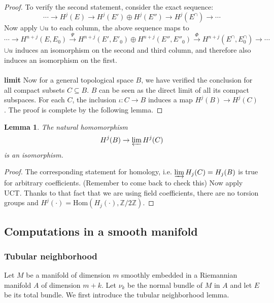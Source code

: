 \documentclass[12pt]{article}
\theoremstyle{plain}
\newtheorem{lemma}[equation]{Lemma}
\theoremstyle{definition}
\newcommand{\IZ}{\mathbb{Z}}
\newcommand{\Hom}{\mathrm{Hom}}
\newcommand{\<}{\langle}
\renewcommand{\>}{\rangle}
\newcommand{\invlim}{\varprojlim}
\begin{document}
\begin{proof}
To verify the second statement, consider the exact sequence: 
$$ \cdots \to H^j(E) \to H^j(E') \oplus H^j(E'') \to H^j(E^\cap) \to \cdots $$
Now apply $\cup u $ to each column, the above sequence maps to 
$$ \cdots \to H^{n + j}(E, E_0) \stackrel{\Psi}{\to} H^{n + j}(E', E'_0) \oplus H^{n + j}(E'', E''_0) \stackrel{\Phi}{\to} H^{n + j}(E^\cap, E^\cap_0) \to \cdots $$ 
$\cup u$ induces an isomorphism on the second and third column, and therefore also induces an isomorphism on the first. \\\\
\textbf{limit}
Now for a general topological space $B$, we have verified the conclusion for all compact subsets $C \subseteq B$. $B$ can be seen as the direct limit of all its compact subspaces. For each $C$, the inclusion $\iota : C \to B$ induces a map $H^j(B) \to H^j(C)$. The proof is complete by the following lemma. 
\end{proof}
\begin{lemma}
The natural homomorphism $$ H^j(B) \to \invlim H^j(C) $$ is an isomorphism. 
\end{lemma}
\begin{proof}
The corresponding statement for homology, i.e. $\varinjlim H_j(C) = H_j(B)$ is true for arbitrary coefficients. (Remember to come back to check this) Now apply UCT. Thanks to that fact that we are using field coefficients, there are no torsion groups and $H^j(\cdot) = \Hom(H_j(\cdot), \IZ/2\IZ)$.
\end{proof}

\subsection{Computations in a smooth manifold}
\subsubsection{Tubular neighborhood}
Let $M$ be a manifold of dimension $m$ smoothly embedded in a Riemannian manifold $A$ of dimension $m + k$. Let $\nu_k$ be the normal bundle of $M$ in $A$ and let $E$ be its total bundle. 
We first introduce the tubular neighborhood lemma. 
\end{document}

